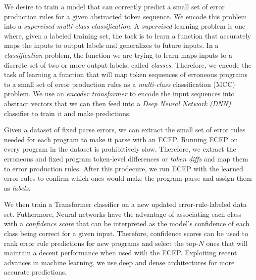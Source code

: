  We desire to train a model that can correctly
predict a small set of error production rules for a given abstracted token
sequence. We encode this problem into a \emph{supervised multi-class
classification}. A \emph{supervised} learning problem is one where, given a
labeled training set, the task is to learn a function that accurately maps the
inputs to output labels and generalizes to future inputs. In a
\emph{classification} problem, the function we are trying to learn maps inputs
to a discrete set of two or more output labels, called \emph{classes}.
Therefore, we encode the task of learning a function that will map token
sequences of erroneous programs to a small set of error production rules as a
\emph{multi-class} classification (MCC) problem. We use an \emph{encoder
transformer} to encode the input sequences into abstract vectors that we can
then feed into a \emph{Deep Neural Network (DNN)} classifier to train it and
make predictions.

Given a dataset of fixed parse errors, we can extract the small set of error
rules needed for each program to make it parse with an ECEP. Running ECEP on
every program in the dataset is prohibitively slow. Therefore, we extract the
erroneous and fixed program token-level differences or \emph{token diffs} and
map them to error production rules. After this prodecure, we run ECEP with the
learned error rules to confirm which ones would make the program parse and
assign them as \emph{labels}.

We then train a Transformer classifier on a new updated error-rule-labeled data
set. Futhermore, Neural networks have the advantage of associating each class
with a \emph{confidence score} that can be interpreted as the model's confidence
of each class being correct for a given input. Therefore, confidence scores can
be used to rank error rule predictions for new programs and select the top-$N$
ones that will maintain a decent performance when used with the ECEP. Exploiting
recent advances in machine learning, we use deep and dense architectures
\citep{Schmidhuber_2015} for more accurate predictions.
